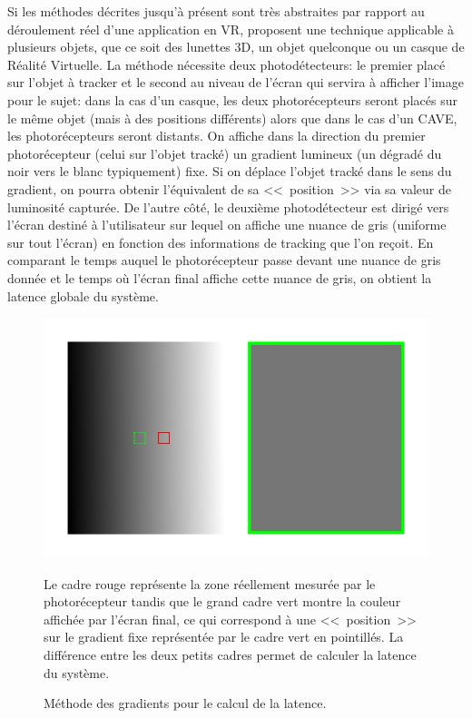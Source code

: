 	\par Si les méthodes décrites jusqu'à présent sont très abstraites par rapport au déroulement réel d'une application en VR, \citep{di_luca_new_2010} proposent une technique applicable à plusieurs objets, que ce soit des lunettes 3D, un objet quelconque ou un casque de Réalité Virtuelle. La méthode nécessite deux photodétecteurs: le premier placé sur l'objet à tracker et le second au niveau de l'écran qui servira à afficher l'image pour le sujet: dans la cas d'un casque, les deux photorécepteurs seront placés sur le même objet (mais à des positions différents) alors que dans le cas d'un CAVE, les photorécepteurs seront distants. On affiche dans la direction du premier photorécepteur (celui sur l'objet tracké) un gradient lumineux (un dégradé du noir vers le blanc typiquement) fixe. Si on déplace l'objet tracké dans le sens du gradient, on pourra obtenir l'équivalent de sa <<~position~>> via sa valeur de luminosité capturée. De l'autre côté, le deuxième photodétecteur est dirigé vers l'écran destiné à l'utilisateur sur lequel on affiche une nuance de gris (uniforme sur tout l'écran) en fonction des informations de tracking que l'on reçoit. En comparant le temps auquel le photorécepteur passe devant une nuance de gris donnée et le temps où l'écran final affiche cette nuance de gris, on obtient la latence globale du système.
	
	\begin{figure}
		\centering
		\includegraphics[scale=.65]{Figures/DiLucaGradient}
		\caption{Méthode des gradients pour le calcul de la latence.}{Le cadre rouge représente la zone réellement mesurée par le photorécepteur tandis que le grand cadre vert montre la couleur affichée par l'écran final, ce qui correspond à une <<~position~>> sur le gradient fixe représentée par le cadre vert en pointillés. La différence entre les deux petits cadres permet de calculer la latence du système.}
		\label{fig:di_luca_gradient}
	\end{figure}
	
